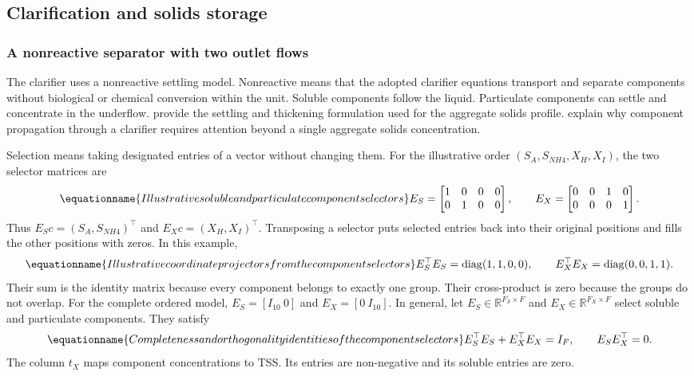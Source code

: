 \subsection{Clarification and solids storage}

\subsubsection{A nonreactive separator with two outlet flows}

The clarifier uses a nonreactive settling model. Nonreactive means that the adopted clarifier equations transport and separate components without biological or chemical conversion within the unit. Soluble components follow the liquid. Particulate components can settle and concentrate in the underflow. \citet{Takacs1991} provide the settling and thickening formulation used for the aggregate solids profile. \citet{JeppssonDiehl1996} explain why component propagation through a clarifier requires attention beyond a single aggregate solids concentration.

Selection means taking designated entries of a vector without changing them. For the illustrative order $(S_A,S_{NH4},X_H,X_I)$, the two selector matrices are
\begin{equation}
\equationname{Illustrative soluble and particulate component selectors}
E_S=\begin{bmatrix}1&0&0&0\\0&1&0&0\end{bmatrix},\qquad
E_X=\begin{bmatrix}0&0&1&0\\0&0&0&1\end{bmatrix}.
\end{equation}
Thus $E_Sc=(S_A,S_{NH4})^\top$ and $E_Xc=(X_H,X_I)^\top$. Transposing a selector puts selected entries back into their original positions and fills the other positions with zeros. In this example,
\begin{equation}
\equationname{Illustrative coordinate projectors from the component selectors}
E_S^\top E_S=\operatorname{diag}(1,1,0,0),\qquad
E_X^\top E_X=\operatorname{diag}(0,0,1,1).
\end{equation}
Their sum is the identity matrix because every component belongs to exactly one group. Their cross-product is zero because the groups do not overlap. For the complete ordered model, $E_S=[I_{10}\ 0]$ and $E_X=[0\ I_{10}]$. In general, let $E_S\in\mathbb R^{F_S\times F}$ and $E_X\in\mathbb R^{F_X\times F}$ select soluble and particulate components. They satisfy
\begin{equation}
\equationname{Completeness and orthogonality identities of the component selectors}
E_S^\top E_S+E_X^\top E_X=I_F,\qquad E_SE_X^\top=0.
\end{equation}
The column $t_X$ maps component concentrations to TSS. Its entries are non-negative and its soluble entries are zero.


